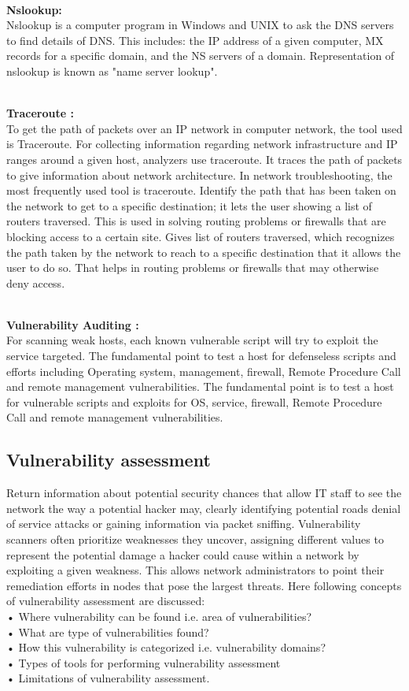 \documentclass[conference]{IEEEtran}
\begin{document}
\\\textbf{Nslookup: }
\\Nslookup is a computer program in Windows and UNIX to ask the DNS servers to find details of DNS. This includes: the IP address of a given computer, MX records for a specific domain, and the NS servers of a domain. Representation of nslookup is known as "name server lookup".

\\\textbf{Traceroute :}
\\To get the path of packets over an IP network in computer network, the tool used is Traceroute. For collecting information regarding network infrastructure and IP ranges around a given host, analyzers use traceroute. It traces the path of packets to give information about network architecture. In network troubleshooting, the most frequently used tool is traceroute. Identify the path that has been taken on the network to get to a specific destination; it lets the user showing a list of routers traversed. This is used in solving routing problems or firewalls that are blocking access to a certain site. Gives list of routers traversed, which recognizes the path taken by the network to reach to a specific destination that it allows the user to do so. That helps in routing problems or firewalls that may otherwise deny access.

\\\textbf{Vulnerability Auditing :}
\\For scanning weak hosts, each known vulnerable script will try to exploit the service targeted. The fundamental point to test a host for defenseless scripts and efforts including Operating system, management, firewall, Remote Procedure Call and remote management vulnerabilities. The fundamental point is to test a host for vulnerable scripts and exploits for OS, service, firewall, Remote Procedure Call and remote management vulnerabilities.

\subsection{Vulnerability assessment}
Return information about potential security chances that allow IT staff to see the network the way a potential hacker may, clearly identifying potential roads denial of service attacks or gaining information via packet sniffing. Vulnerability scanners often prioritize weaknesses they uncover, assigning different values to represent the potential damage a hacker could cause within a network by exploiting a given weakness. This allows network administrators to point their remediation efforts in nodes that pose the largest threats.
Here following concepts of vulnerability assessment are discussed:
\\• Where vulnerability can be found i.e. area of vulnerabilities?
\\• What are type of vulnerabilities found?
\\• How this vulnerability is categorized i.e. vulnerability domains?
\\• Types of tools for performing vulnerability assessment
\\• Limitations of vulnerability assessment.
\end{document}
